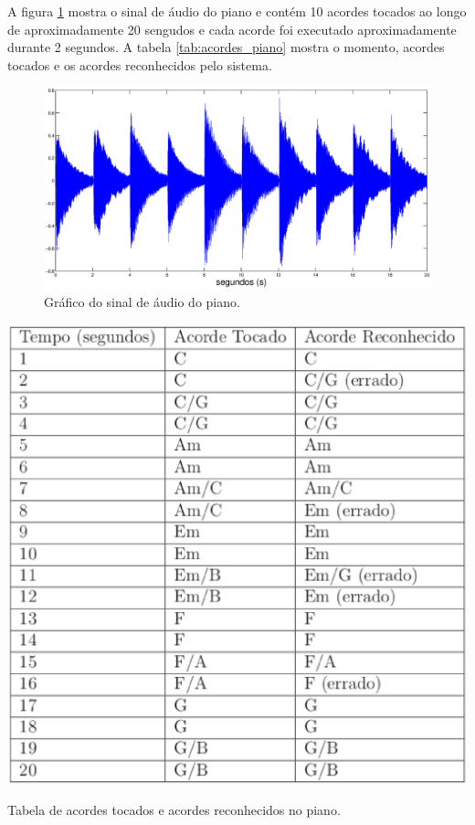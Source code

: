 A figura \ref{fig:acordes_piano} mostra o sinal de áudio do piano e contém 10 acordes tocados ao longo de aproximadamente 20 sengudos e cada acorde foi executado aproximadamente durante 2 segundos. A tabela \ref{tab:acordes_piano} mostra o momento, acordes tocados e os acordes reconhecidos pelo sistema.

\newpage
\begin{figure}[t!]
    \centering
    \includegraphics[keepaspectratio=true,scale=0.4]{figuras/acordes_piano.eps}
  \caption{Gráfico do sinal de áudio do piano.}
  \label{fig:acordes_piano}
\end{figure}

\begin{table}[h]
\centering
    \includegraphics[keepaspectratio=true,scale=0.5]{figuras/tabela_acordes_piano.eps}
  \caption{Tabela de acordes tocados e acordes reconhecidos no piano.}
  \label{tab:acordes_piano}
\end{table}


